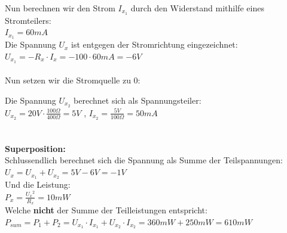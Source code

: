 																					Nun berechnen wir den Strom $I_{x_1}$ durch den Widerstand mithilfe eines Stromteilers: \\
																					$I_{x_1} = 60mA$ \\
																					Die Spannung $U_x$ ist entgegen der Stromrichtung eingezeichnet: \\
																					$U_{x_1} = - R_x \cdot I_x = - 100 \cdot 60mA = -6V $ \\
																					\\
																					Nun setzen wir die Stromquelle zu 0: \\
																					\begin{center}
																						\fix
																					\end{center}

																					Die Spannung $U_{x_2}$ berechnet sich als Spannungsteiler: \\
																					$U_{x_2} = 20V \cdot \frac{100\Omega}{400\Omega} = 5V$ , $ I_{x_2} = \frac{5V}{100\Omega} = 50mA $\\
																					\\
																					\\
																					\textbf{Superposition:} \\
																					Schlussendlich berechnet sich die Spannung als Summe der Teilspannungen: \\
																					$\displaystyle U_x = U_{x_1} + U_{x_2} = 5V -6V = -1V $ \\
																					Und die Leistung: \\
																					$\displaystyle P_x = \frac{{U_x}^2}{R_x} = 10mW$ \\
																					Welche \textbf{nicht} der Summe der Teilleistungen entspricht: \\
																					$\displaystyle P_{sum} = P_1 + P_2 = U_{x_1} \cdot I_{x_1} + U_{x_2} \cdot I_{x_2} = 360mW + 250mW = 610mW$


